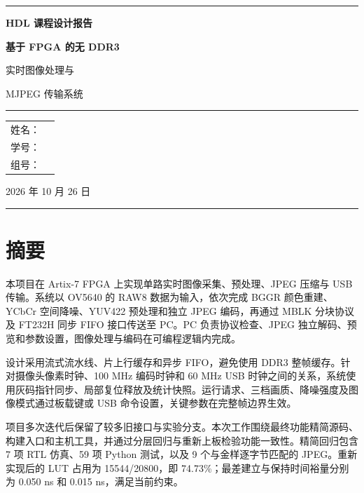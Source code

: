 \documentclass[12pt,a4paper]{article}
\renewcommand{\arraystretch}{1.2}
\newcommand{\reportname}{\underline{\makebox[3.8cm]{}}}
\newcommand{\reportstudentid}{\underline{\makebox[3.8cm]{}}}
\newcommand{\reportgroup}{\underline{\makebox[3.8cm]{}}}
\begin{document}
\begin{titlepage}
    \centering
    \rule{\textwidth}{0pt}\par
    \vspace{0.18\textheight}
    {\Huge\textbf{HDL 课程设计报告}\par}
    \vspace{0.025\textheight}
    {\fontsize{30}{42}\selectfont\bfseries
      基于 FPGA 的无 DDR3\par
      实时图像处理与\par
      MJPEG 传输系统\par}
    \rule{0.83\textwidth}{0pt}
    \vspace{0.02\textheight}
    {\Large
    \renewcommand{\arraystretch}{1.65}
    \begin{tabular}{rl}
      姓名： & \reportname\\
      学号： & \reportstudentid\\
      组号： & \reportgroup
    \end{tabular}\par}
    \vspace{0.06\textheight}
    {\huge 2026 年 10 月 26 日\par}
    \vspace{0.08\textheight}
    \rule{\textwidth}{0pt}
\end{titlepage}




\section*{摘\quad 要}
本项目在 Artix-7 FPGA 上实现单路实时图像采集、预处理、JPEG 压缩与 USB 传输。系统以 OV5640 的 RAW8 数据为输入，依次完成 BGGR 颜色重建、YCbCr 空间降噪、YUV422 预处理和独立 JPEG 编码，再通过 MBLK 分块协议及 FT232H 同步 FIFO 接口传送至 PC。PC 负责协议检查、JPEG 独立解码、预览和参数设置，图像处理与编码在可编程逻辑内完成。

设计采用流式流水线、片上行缓存和异步 FIFO，避免使用 DDR3 整帧缓存。针对摄像头像素时钟、100 MHz 编码时钟和 60 MHz USB 时钟之间的关系，系统使用灰码指针同步、局部复位释放及统计快照。运行请求、三档画质、降噪强度及图像模式通过板载键或 USB 命令设置，关键参数在完整帧边界生效。

项目多次迭代后保留了较多旧接口与实验分支。本次工作围绕最终功能精简源码、构建入口和主机工具，并通过分层回归与重新上板检验功能一致性。精简回归包含 7 项 RTL 仿真、59 项 Python 测试，以及 9 个与金样逐字节匹配的 JPEG。重新实现后的 LUT 占用为 15544/20800，即 74.73\%；最差建立与保持时间裕量分别为 0.050 ns 和 0.015 ns，满足当前约束。
\end{document}
